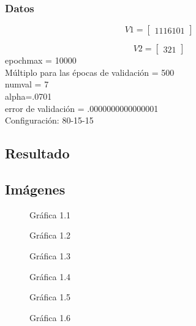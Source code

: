 \documentclass{article}
\begin{document}
\subsubsection{Datos}
\[V1=
\begin{bmatrix}
11 16 10 1
\end{bmatrix}\]

\[V2=
\begin{bmatrix}
3 2 1
\end{bmatrix}\]
epochmax = 10000\\
Múltiplo para las épocas de validación = 500\\
numval = 7\\
alpha=.0701\\
error de validación = .0000000000000001\\
Configuración: 80-15-15
\subsection{Resultado}
\subsection{Imágenes}
\begin{figure}[htpb]
	\centering
	
	\caption{Gráfica 1.1}
\end{figure}

\begin{figure}[htpb]
	\centering
	
	\caption{Gráfica 1.2}
\end{figure}

\begin{figure}[htpb]
	\centering
	
	\caption{Gráfica 1.3}
\end{figure}

\begin{figure}[htpb]
	\centering
	
	\caption{Gráfica 1.4}
\end{figure}

\begin{figure}[htpb]
	\centering
	
	\caption{Gráfica 1.5}
\end{figure}

\begin{figure}[htpb]
	\centering
	
	\caption{Gráfica 1.6}
\end{figure}
\end{document}
